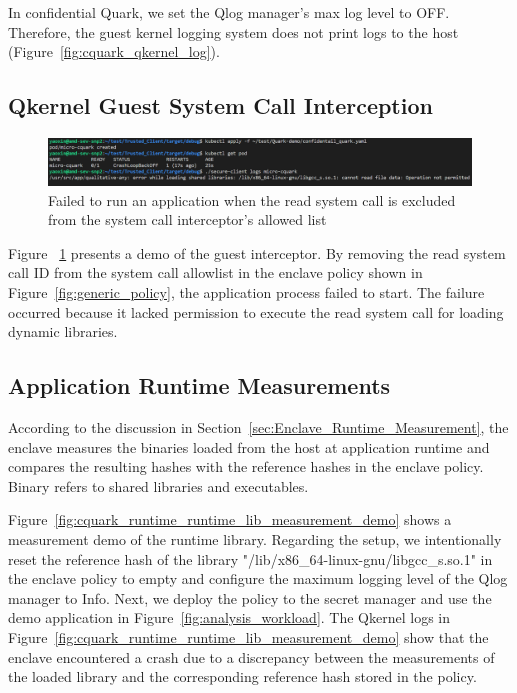 In confidential Quark, we set the Qlog manager's max log level to OFF. Therefore, the guest kernel logging system does not print logs to the host (Figure~\ref{fig:cquark_qkernel_log}).

\subsection{Qkernel Guest System Call Interception}

\begin{figure}[!htb]
    \centering
    \includegraphics[width=1\textwidth]{images/application_failed_to_start_due_to_syscall_interceptor.png}
    \caption[Failed to run an application when the read system call is excluded from the system call interceptor's allowed list]{Failed to run an application when the read system call is excluded from the system call interceptor's allowed list}
    \label{fig:application_failed_to_start_due_to_syscall_interceptor}
\end{figure}


Figure ~\ref{fig:application_failed_to_start_due_to_syscall_interceptor} presents a demo of the guest interceptor. By removing the read system call ID from the system call allowlist in the enclave policy shown in Figure~\ref{fig:generic_policy}, 
the application process failed to start. The failure occurred because it lacked permission to execute the read system call for loading dynamic libraries.

\subsection{Application Runtime Measurements}




According to the discussion in Section~\ref{sec:Enclave_Runtime_Measurement}, the enclave measures the binaries loaded from the host at application runtime and compares the resulting hashes with the reference hashes in the enclave policy. Binary refers to shared libraries and executables. 

Figure~\ref{fig:cquark_runtime_runtime_lib_measurement_demo} shows a measurement demo of the runtime library. Regarding the setup, we intentionally reset the reference hash of the library "/lib/x86\_64-linux-gnu/libgcc\_s.so.1" in the enclave policy to empty and configure the maximum logging level of the Qlog manager to Info. Next, 
we deploy the policy to the secret manager and use the demo application in Figure~\ref{fig:analysis_workload}. The Qkernel logs in Figure~\ref{fig:cquark_runtime_runtime_lib_measurement_demo} show that the enclave encountered a crash due to a discrepancy between the measurements of the loaded library and the corresponding reference hash stored in the policy.



